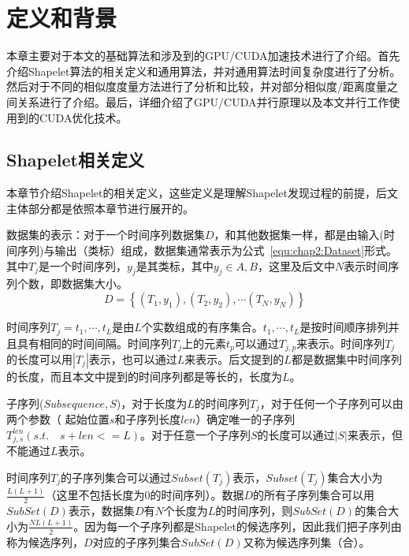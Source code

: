 \chapter{定义和背景}
\label{cha:chap02}

本章主要对于本文的基础算法和涉及到的GPU/CUDA加速技术进行了介绍。首先介绍Shapelet算法的相关定义和通用算法，并对通用算法时间复杂度进行了分析。然后对于不同的相似度度量方法进行了分析和比较，并对部分相似度/距离度量之间关系进行了介绍。最后，详细介绍了GPU/CUDA并行原理以及本文并行工作使用到的CUDA优化技术。


\section{Shapelet相关定义}
\label{cha:chap02:def}
本章节介绍Shapelet的相关定义\cite{ye2009time}，这些定义是理解Shapelet发现过程的前提，后文主体部分都是依照本章节进行展开的。

\begin{definition}
	数据集的表示：对于一个时间序列数据集$D$，和其他数据集一样，都是由输入(时间序列)与输出（类标）组成，数据集通常表示为公式~\ref{equ:chap2:Dataset}形式。其中$T_j$是一个时间序列，$y_j$是其类标，其中$y_j\in{A,B}$，这里及后文中$N$表示时间序列个数，即数据集大小。
	\begin{equation}
	\label{equ:chap2:Dataset}
	D = \left\lbrace (T_1,y_1),(T_2,y_2),\cdots (T_N,y_N)\right\rbrace 
	\end{equation}
\end{definition}


\begin{definition}
	时间序列$T_j=t_1,\cdots,t_L$是由$L$个实数组成的有序集合。$t_1,\cdots,t_L$是按时间顺序排列并且具有相同的时间间隔。时间序列$T_j$上的元素$t_p$可以通过$T_{j,p}$来表示。时间序列$T_j$的长度可以用$|T_j|$表示，也可以通过$L$来表示。后文提到的$L$都是数据集中时间序列的长度，而且本文中提到的时间序列都是等长的，长度为$L$。
\end{definition}

\begin{definition}
\label{def:chap02:Subsequence}
	子序列($Subsequence,S$)，对于长度为$L$的时间序列$T_j$，对于任何一个子序列可以由两个参数（ 起始位置$s$和子序列长度$len$）确定唯一的子序列$T_{j,s}^{len}(s.t.\quad s+len <= L)$。对于任意一个子序列$S$的长度可以通过$|S|$来表示，但不能通过$L$表示。
	
	时间序列$T_j$的子序列集合可以通过$Subset(T_j)$表示，$Subset(T_j)$集合大小为$\frac{L(L+1)}{2}$（这里不包括长度为0的时间序列）。数据$D$的所有子序列集合可以用$SubSet(D)$表示，数据集$D$有$N$个长度为$L$的时间序列，则$SubSet(D)$的集合大小为$\frac{NL(L+1)}{2}$。因为每一个子序列都是Shapelet的候选序列，因此我们把子序列由称为候选序列，$D$对应的子序列集合$SubSet(D)$又称为候选序列集（合）。
\end{definition}

